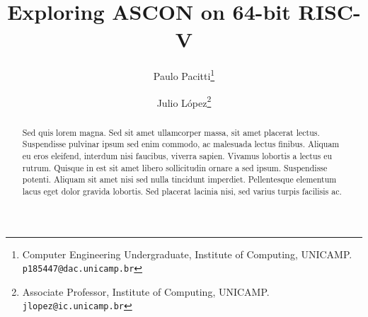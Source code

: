 \documentclass[11pt,twoside]{article}
\begin{document}
% 
\TRMakeCover


%
\pagestyle{myheadings}
\thispagestyle{empty}

%
\title{Exploring ASCON on 64-bit RISC-V}

\author{Paulo Pacitti\thanks{Computer Engineering Undergraduate, Institute of Computing, UNICAMP. \texttt{p185447@dac.unicamp.br}} \and
  Julio  López\thanks{Associate Professor, Institute of Computing, UNICAMP. \texttt{jlopez@ic.unicamp.br}}}
\date{}
\maketitle


\begin{abstract}
  Sed quis lorem magna. Sed sit amet ullamcorper massa, sit amet placerat lectus. Suspendisse pulvinar ipsum sed enim commodo, ac malesuada lectus finibus. Aliquam eu eros eleifend, interdum nisi faucibus, viverra sapien. Vivamus lobortis a lectus eu rutrum.
  Quisque in est sit amet libero sollicitudin ornare a sed ipsum. Suspendisse potenti.
  Aliquam sit amet nisi sed nulla tincidunt imperdiet. Pellentesque elementum lacus eget
  dolor gravida lobortis. Sed placerat lacinia nisi, sed varius turpis facilisis ac.
\end{abstract}
\end{document}
